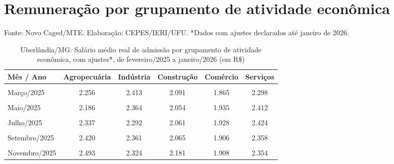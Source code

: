 \documentclass[
  12pt,
]{article}
\begin{document}
\section{Remuneração por grupamento de atividade
econômica}\label{remunerauxe7uxe3o-por-grupamento-de-atividade-econuxf4mica}

\begin{ThreePartTable}
\begin{TableNotes}
\item Fonte: Novo Caged/MTE. Elaboração: CEPES/IERI/UFU. *Dados com ajustes declarados até janeiro de 2026.
\end{TableNotes}
\begin{longtable}[t]{>{\centering\arraybackslash}p{10cm}ccccc}
\caption{\label{tab:tabela6}Uberlândia/MG: Salário médio real de admissão por grupamento de atividade econômica, com ajustes*, de fevereiro/2025 a janeiro/2026 (em R\$)}\\
\toprule
Mês / Ano & Agropecuária & Indústria & Construção & Comércio & Serviços\\
\midrule
\cellcolor{gray!10}{Fevereiro/2025} & \cellcolor{gray!10}{2.326} & \cellcolor{gray!10}{2.288} & \cellcolor{gray!10}{2.089} & \cellcolor{gray!10}{1.880} & \cellcolor{gray!10}{2.266}\\
Março/2025 & 2.256 & 2.413 & 2.091 & 1.865 & 2.298\\
\cellcolor{gray!10}{Abril/2025} & \cellcolor{gray!10}{2.146} & \cellcolor{gray!10}{2.213} & \cellcolor{gray!10}{2.114} & \cellcolor{gray!10}{1.912} & \cellcolor{gray!10}{2.348}\\
Maio/2025 & 2.186 & 2.364 & 2.054 & 1.935 & 2.412\\
\cellcolor{gray!10}{Junho/2025} & \cellcolor{gray!10}{2.202} & \cellcolor{gray!10}{2.271} & \cellcolor{gray!10}{2.080} & \cellcolor{gray!10}{1.930} & \cellcolor{gray!10}{2.359}\\
\addlinespace
Julho/2025 & 2.337 & 2.292 & 2.061 & 1.928 & 2.424\\
\cellcolor{gray!10}{Agosto/2025} & \cellcolor{gray!10}{2.650} & \cellcolor{gray!10}{2.327} & \cellcolor{gray!10}{2.092} & \cellcolor{gray!10}{1.896} & \cellcolor{gray!10}{2.408}\\
Setembro/2025 & 2.420 & 2.361 & 2.065 & 1.906 & 2.358\\
\cellcolor{gray!10}{Outubro/2025} & \cellcolor{gray!10}{2.597} & \cellcolor{gray!10}{2.345} & \cellcolor{gray!10}{2.083} & \cellcolor{gray!10}{1.937} & \cellcolor{gray!10}{2.320}\\
Novembro/2025 & 2.493 & 2.324 & 2.181 & 1.908 & 2.354\\

\end{longtable}
\end{ThreePartTable}
\end{document}
